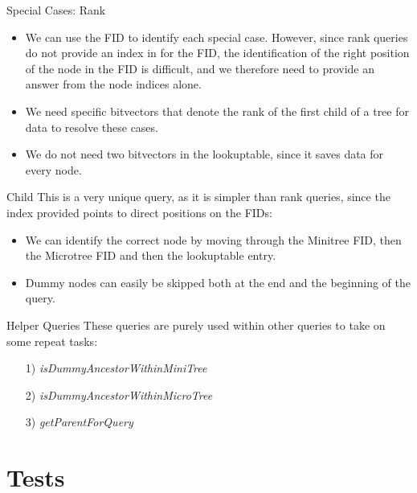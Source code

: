 \documentclass{beamer}
\begin{document}
\begin{frame}{Special Cases: Rank}
	\begin{itemize}
	\item
		We can use the FID to identify each special case. However, since rank queries do not provide an index in for the FID, the identification of the right position of the node in the FID is difficult, and we therefore need to provide an answer from the node indices alone.
	\item
		We need specific bitvectors that denote the rank of the first child of a tree for data to resolve these cases.
	\item
		We do not need two bitvectors in the lookuptable, since it saves data for every node.
	\end{itemize}
\end{frame}

\begin{frame}{Child}
	This is a very unique query, as it is simpler than rank queries, since the index provided points to direct positions on the FIDs:
	\begin{itemize}
	\item
		We can identify the correct node by moving through the Minitree FID, then the Microtree FID and then the lookuptable entry.
	\item
		Dummy nodes can easily be skipped both at the end and the beginning of the query.
	\end{itemize}
\end{frame}

\begin{frame}{Helper Queries}
	These queries are purely used within other queries to take on some repeat tasks:
	\begin{itemize}
	\item[1)] \textit{isDummyAncestorWithinMiniTree}
	\item[2)] \textit{isDummyAncestorWithinMicroTree}
	\item[3)] \textit{getParentForQuery}
	\end{itemize}
\end{frame}

\section{Tests}
\end{document}
